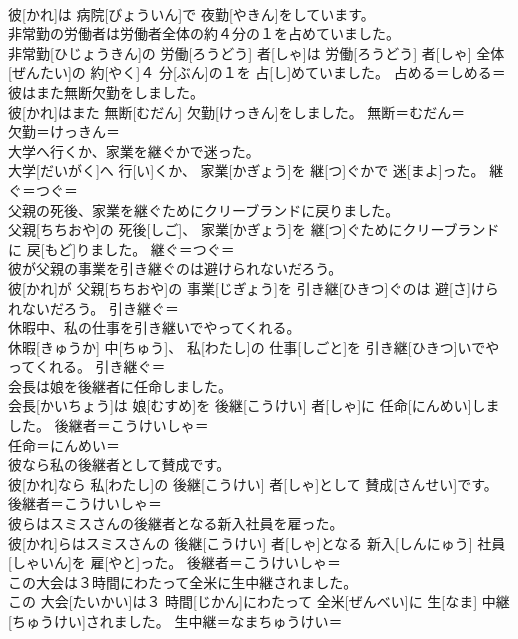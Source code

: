 \documentclass[8pt]{extreport}
\begin{document}
\begin{CJK}{UTF8}{min}
\\	彼[かれ]は 病院[びょういん]で 夜勤[やきん]をしています。	
\\	非常勤の労働者は労働者全体の約４分の１を占めていました。	
\\	非常勤[ひじょうきん]の 労働[ろうどう] 者[しゃ]は 労働[ろうどう] 者[しゃ] 全体[ぜんたい]の 約[やく]４ 分[ぶん]の１を 占[し]めていました。	占める＝しめる＝ 
\\	彼はまた無断欠勤をしました。	
\\	彼[かれ]はまた 無断[むだん] 欠勤[けっきん]をしました。	無断＝むだん＝ 
\\	欠勤＝けっきん＝ 
\\	大学へ行くか、家業を継ぐかで迷った。	
\\	大学[だいがく]へ 行[い]くか、 家業[かぎょう]を 継[つ]ぐかで 迷[まよ]った。	継ぐ＝つぐ＝ 
\\	父親の死後、家業を継ぐためにクリーブランドに戻りました。	
\\	父親[ちちおや]の 死後[しご]、 家業[かぎょう]を 継[つ]ぐためにクリーブランドに 戻[もど]りました。	継ぐ＝つぐ＝ 
\\	彼が父親の事業を引き継ぐのは避けられないだろう。	
\\	彼[かれ]が 父親[ちちおや]の 事業[じぎょう]を 引き継[ひきつ]ぐのは 避[さ]けられないだろう。	引き継ぐ＝ 
\\	休暇中、私の仕事を引き継いでやってくれる。	
\\	休暇[きゅうか] 中[ちゅう]、 私[わたし]の 仕事[しごと]を 引き継[ひきつ]いでやってくれる。	引き継ぐ＝ 
\\	会長は娘を後継者に任命しました。	
\\	会長[かいちょう]は 娘[むすめ]を 後継[こうけい] 者[しゃ]に 任命[にんめい]しました。	後継者＝こうけいしゃ＝ 
\\	任命＝にんめい＝ 
\\	彼なら私の後継者として賛成です。	
\\	彼[かれ]なら 私[わたし]の 後継[こうけい] 者[しゃ]として 賛成[さんせい]です。	後継者＝こうけいしゃ＝ 
\\	彼らはスミスさんの後継者となる新入社員を雇った。	
\\	彼[かれ]らはスミスさんの 後継[こうけい] 者[しゃ]となる 新入[しんにゅう] 社員[しゃいん]を 雇[やと]った。	後継者＝こうけいしゃ＝ 
\\	この大会は３時間にわたって全米に生中継されました。	
\\	この 大会[たいかい]は３ 時間[じかん]にわたって 全米[ぜんべい]に 生[なま] 中継[ちゅうけい]されました。	生中継＝なまちゅうけい＝ 

\end{CJK}
\end{document}
